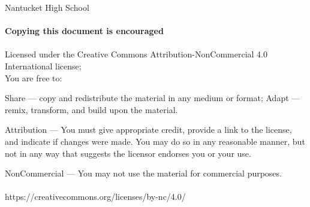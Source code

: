
\null\vfill
\noindent
Nantucket High School 
\\ \\
\textbf{Copying this document is encouraged} 
\\ \\ 
Licensed under the Creative Commons Attribution-NonCommercial 4.0 International license; 
\\ 
    You are free to: 
    
    Share — copy and redistribute the material in any medium or format; Adapt — remix, transform, and build upon the material.  
    
    Attribution — You must give appropriate credit, provide a link to the license, and indicate if changes were made. You may do so in any reasonable manner, but not in any way that suggests the licensor endorses you or your use. 
    
    NonCommercial — You may not use the material for commercial purposes. 
    \\ \\
    https://creativecommons.org/licenses/by-nc/4.0/
    
    
\newpage
